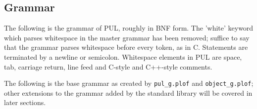 \subsection{Grammar}

The following is the grammar of PUL, roughly in BNF form. The 'white' keyword which parses whitespace in the master grammar has been removed; suffice to say that the grammar parses whitespace before every token, as in C. Statements are terminated by a newline or semicolon. Whitespace elements in PUL are space, tab, carriage return, line feed and C-style and C++-style comments.

The following is the base grammar as created by \texttt{pul\_g.plof} and \texttt{object\_g.plof}; other extensions to the grammar added by the standard library will be covered in later sections.



